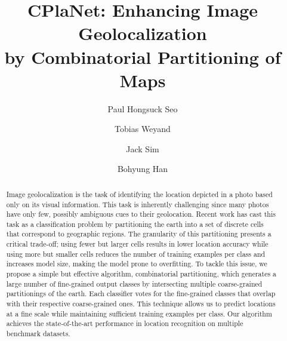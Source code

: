 \documentclass[runningheads]{llncs}
\begin{document}
\pagestyle{headings}
\mainmatter
\def\ECCV18SubNumber{2333}  

\title{CPlaNet: Enhancing Image Geolocalization \\ by Combinatorial Partitioning of Maps} 



\author{Paul Hongsuck Seo \and Tobias Weyand \and Jack Sim \and Bohyung Han}

\maketitle



\begin{abstract}
Image geolocalization is the task of identifying the location depicted in a photo based only on its visual information. 
This task is inherently challenging since many photos have only few, possibly ambiguous cues to their geolocation.
Recent work has cast this task as a classification problem by partitioning the earth into a set of discrete cells that correspond to geographic regions.
The granularity of this partitioning presents a critical trade-off; using fewer but larger cells results in lower location accuracy while using more but smaller cells reduces the number of training examples per class and increases model size, making the model prone to overfitting.
To tackle this issue, we propose a simple but effective algorithm, combinatorial partitioning, which generates a large number of fine-grained output classes by intersecting multiple coarse-grained partitionings of the earth.
Each classifier votes for the fine-grained classes that overlap with their respective coarse-grained ones. 
This technique allows us to predict locations at a fine scale while maintaining sufficient training examples per class.
Our algorithm achieves the state-of-the-art performance in location recognition on multiple benchmark datasets.
\end{abstract} 
\end{document}
